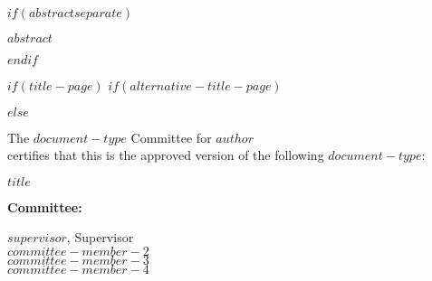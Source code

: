 \documentclass[letterpaper, $if(page-layout)$$page-layout$$else$nobind$endif$]{templates/ociamthesis}
\begin{document}
$if(abstractseparate)$
\begin{abstractseparate}
  $abstract$
\end{abstractseparate}
$endif$

\begin{romanpages}

$if(title-page)$
$if(alternative-title-page)$

$else$


\thispagestyle{empty} %
\begin{center}
  The $document-type$ Committee for $author$\\
  certifies that this is the approved version of the following $document-type$:\\
  \vspace*{30pt}
  \begin{spacing}{2}
    {\Large{\textbf{$title$}}}
  \end{spacing}
\end{center}

\vspace*{55pt}

\phantom{x}\hspace{45ex} {\large{\textbf{Committee:}}}\\

\begin{flushright}
  $supervisor$, Supervisor\\
  \vspace*{24pt}
  $committee-member-2$\\
  \vspace*{24pt}
  $committee-member-3$\\
  \vspace*{24pt}
  $committee-member-4$
\end{flushright}



\end{romanpages}
\end{document}
